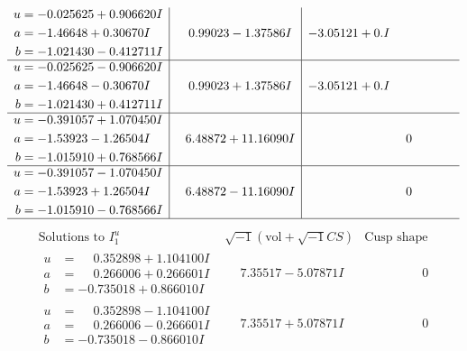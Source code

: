 \documentclass[1p]{elsarticle_modified}
\theoremstyle{definition}
\newcommand{\I}{\sqrt{-1}}
\begin{document}
$$\begin{array}{c|c|c}
\begin{aligned}
u &= -0.025625 + 0.906620 I \\
a &= -1.46648 + 0.30670 I \\
b &= -1.021430 - 0.412711 I\end{aligned}
 & \phantom{-}0.99023 - 1.37586 I & -3.05121 + 0. I\phantom{ +0.000000I} \\ \hline\begin{aligned}
u &= -0.025625 - 0.906620 I \\
a &= -1.46648 - 0.30670 I \\
b &= -1.021430 + 0.412711 I\end{aligned}
 & \phantom{-}0.99023 + 1.37586 I & -3.05121 + 0. I\phantom{ +0.000000I} \\ \hline\begin{aligned}
u &= -0.391057 + 1.070450 I \\
a &= -1.53923 - 1.26504 I \\
b &= -1.015910 + 0.768566 I\end{aligned}
 & \phantom{-}6.48872 + 11.16090 I & \phantom{-0.000000 } 0 \\ \hline\begin{aligned}
u &= -0.391057 - 1.070450 I \\
a &= -1.53923 + 1.26504 I \\
b &= -1.015910 - 0.768566 I\end{aligned}
 & \phantom{-}6.48872 - 11.16090 I & \phantom{-0.000000 } 0\\
 \hline 
 \end{array}$$\newpage$$\begin{array}{c|c|c}  
\text{Solutions to }I^u_{1}& \I (\text{vol} + \sqrt{-1}CS) & \text{Cusp shape}\\
 \hline 
\begin{aligned}
u &= \phantom{-}0.352898 + 1.104100 I \\
a &= \phantom{-}0.266006 + 0.266601 I \\
b &= -0.735018 + 0.866010 I\end{aligned}
 & \phantom{-}7.35517 - 5.07871 I & \phantom{-0.000000 } 0 \\ \hline\begin{aligned}
u &= \phantom{-}0.352898 - 1.104100 I \\
a &= \phantom{-}0.266006 - 0.266601 I \\
b &= -0.735018 - 0.866010 I\end{aligned}
 & \phantom{-}7.35517 + 5.07871 I & \phantom{-0.000000 } 0 \\ \hline\begin{aligned}

\end{aligned}
\end{array}$$
\end{document}
